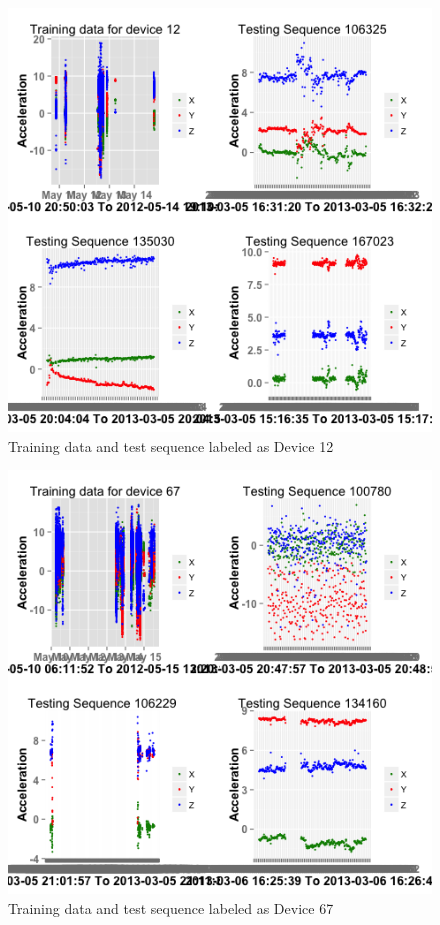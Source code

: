 \documentclass{article}
\begin{document}
 \begin{figure}[ht]
 	\centering
 	\includegraphics[width=1\textwidth]{photoshare/Device-12.png}
 	\caption{Training data and test sequence labeled as Device 12}
 \end{figure}


 \begin{figure}[ht]
 	\centering
	\includegraphics[width=1\textwidth]{photoshare/Device-67.png}
 	\caption{Training data and test sequence labeled as Device 67}
 \end{figure}
	
\end{document}
